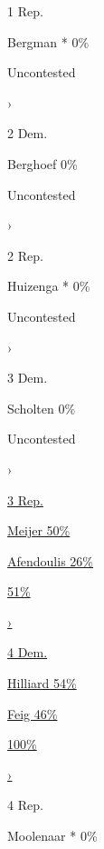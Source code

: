 1 Rep.

 Bergman * 0\%

Uncontested

›

2 Dem.

 Berghoef 0\%

Uncontested

›

2 Rep.

 Huizenga * 0\%

Uncontested

›

3 Dem.

 Scholten 0\%

Uncontested

›

\href{https://www.nytimes.com/interactive/2020/08/04/us/elections/results-michigan-house-district-3-primary-election.html}{3
Rep.}

\href{https://www.nytimes.com/interactive/2020/08/04/us/elections/results-michigan-house-district-3-primary-election.html}{
Meijer 50\% }

\href{https://www.nytimes.com/interactive/2020/08/04/us/elections/results-michigan-house-district-3-primary-election.html}{
Afendoulis 26\% }

\href{https://www.nytimes.com/interactive/2020/08/04/us/elections/results-michigan-house-district-3-primary-election.html}{51\%}

\href{https://www.nytimes.com/interactive/2020/08/04/us/elections/results-michigan-house-district-3-primary-election.html}{›}

\href{https://www.nytimes.com/interactive/2020/08/04/us/elections/results-michigan-house-district-4-primary-election.html}{4
Dem.}

\href{https://www.nytimes.com/interactive/2020/08/04/us/elections/results-michigan-house-district-4-primary-election.html}{
Hilliard 54\% }

\href{https://www.nytimes.com/interactive/2020/08/04/us/elections/results-michigan-house-district-4-primary-election.html}{
Feig 46\% }

\href{https://www.nytimes.com/interactive/2020/08/04/us/elections/results-michigan-house-district-4-primary-election.html}{100\%}

\href{https://www.nytimes.com/interactive/2020/08/04/us/elections/results-michigan-house-district-4-primary-election.html}{›}

4 Rep.

 Moolenaar * 0\%


